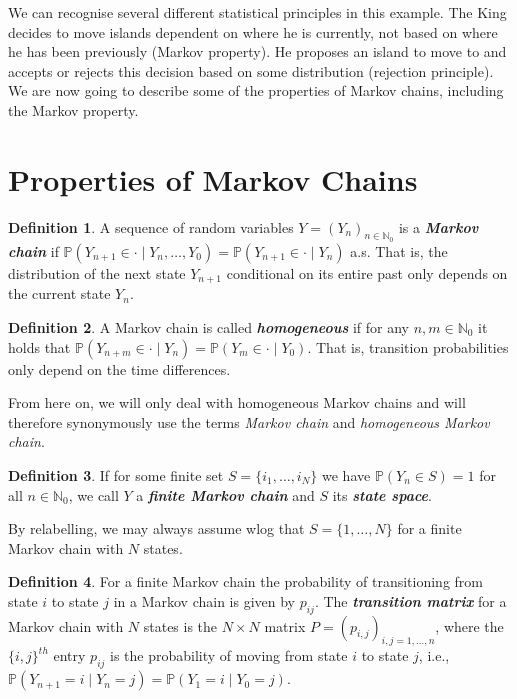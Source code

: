 \documentclass[
]{book}
\theoremstyle{definition}
\newtheorem{definition}{Definition}[chapter]
\theoremstyle{definition}
\theoremstyle{definition}
\theoremstyle{definition}
\theoremstyle{remark}
\begin{document}
We can recognise several different statistical principles in this example. The King decides to move islands dependent on where he is currently, not based on where he has been previously (Markov property). He proposes an island to move to and accepts or rejects this decision based on some distribution (rejection principle). We are now going to describe some of the properties of Markov chains, including the Markov property.

\section{Properties of Markov Chains}\label{properties-of-markov-chains}

\begin{definition}
\protect\hypertarget{def:Markov}{}\label{def:Markov}A sequence of random variables \(Y = (Y_n)_{n \in \mathbb{N}_0}\) is a \textbf{\emph{Markov chain}} if \(\mathbb{P}(Y_{n+1} \in \cdot \mid Y_{n}, \ldots, Y_0) = \mathbb{P}(Y_{n+1} \in \cdot \mid Y_{n})\) a.s. That is, the distribution of the next state \(Y_{n+1}\) conditional on its entire past only depends on the current state \(Y_n\).
\end{definition}

\begin{definition}
A Markov chain is called \textbf{\emph{homogeneous}} if for any \(n,m \in \mathbb{N}_0\) it holds that \(\mathbb{P}(Y_{n+ m} \in \cdot \mid Y_n) = \mathbb{P}(Y_{m} \in \cdot \mid Y_0)\). That is, transition probabilities only depend on the time differences.
\end{definition}

From here on, we will only deal with homogeneous Markov chains and will therefore synonymously use the terms \emph{Markov chain} and \emph{homogeneous Markov chain}.

\begin{definition}
If for some finite set \(S = \{i_1,\ldots,i_N\}\) we have \(\mathbb{P}(Y_n \in S) = 1\) for all \(n \in \mathbb{N}_0\), we call \(Y\) a \textbf{\emph{finite Markov chain}} and \(S\) its \textbf{\emph{state space}}.
\end{definition}

By relabelling, we may always assume wlog that \(S = \{1,\ldots,N\}\) for a finite Markov chain with \(N\) states.

\begin{definition}
For a finite Markov chain the probability of transitioning from state \(i\) to state \(j\) in a Markov chain is given by \(p_{ij}\). The \textbf{\emph{transition matrix}} for a Markov chain with \(N\) states is the \(N \times N\) matrix \(P = (p_{i,j})_{i,j=1,\ldots,n}\), where the \(\{i, j\}^{th}\) entry \(p_{ij}\) is the probability of moving from state \(i\) to state \(j\), i.e., \(\mathbb{P}(Y_{n+1} = i \mid Y_n = j) = \mathbb{P}(Y_{1} = i \mid Y_0 = j).\)
\end{definition}
\end{document}

